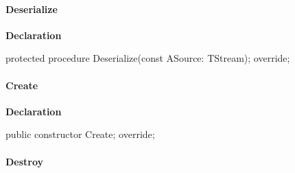 \documentclass{report}
\newif\ifpdf
\begin{document}
\paragraph*{Deserialize}\hspace*{\fill}

\label{PasDoc_Items.TPasUnit-Deserialize}
\begin{list}{}{
\setlength{\itemindent}{0cm}
\setlength{\listparindent}{0cm}
\setlength{\leftmargin}{\evensidemargin}
\addtolength{\leftmargin}{\tmplength}
\settowidth{\labelsep}{X}
\addtolength{\leftmargin}{\labelsep}
\setlength{\labelwidth}{\tmplength}
}
\item[\textbf{Declaration}\hfill]
\ifpdf
\begin{flushleft}
\fi
\begin{ttfamily}
protected procedure Deserialize(const ASource: TStream); override;\end{ttfamily}

\ifpdf
\end{flushleft}
\fi

\end{list}
\paragraph*{Create}\hspace*{\fill}

\label{PasDoc_Items.TPasUnit-Create}
\begin{list}{}{
\setlength{\itemindent}{0cm}
\setlength{\listparindent}{0cm}
\setlength{\leftmargin}{\evensidemargin}
\addtolength{\leftmargin}{\tmplength}
\settowidth{\labelsep}{X}
\addtolength{\leftmargin}{\labelsep}
\setlength{\labelwidth}{\tmplength}
}
\item[\textbf{Declaration}\hfill]
\ifpdf
\begin{flushleft}
\fi
\begin{ttfamily}
public constructor Create; override;\end{ttfamily}

\ifpdf
\end{flushleft}
\fi

\end{list}
\paragraph*{Destroy}\hspace*{\fill}
\end{document}
